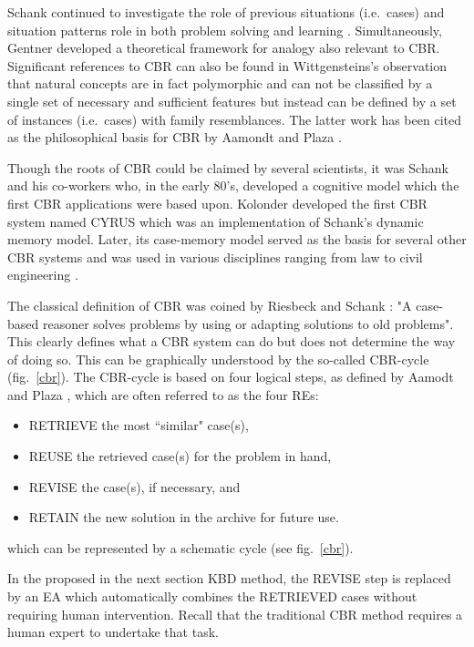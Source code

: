 Schank continued to investigate the role of previous situations (i.e.\ cases) 
and situation patterns role in both problem solving and learning \cite{Schank_1982}.  
Simultaneously, Gentner \cite{genter_1983} developed a  
theoretical framework for analogy also relevant to CBR. Significant references to CBR can also be found in 
Wittgensteins's observation \cite{wittgestein_1953} that natural concepts are in fact 
polymorphic and can not be classified by a single set of necessary and sufficient 
features but instead can be defined by a set of instances (i.e.\ cases) with family 
resemblances. The latter work has been cited as the philosophical basis for CBR by Aamondt and Plaza \cite{aamond_plaza_1994}.

Though the roots of CBR could be claimed by several scientists, it was Schank and his co-workers who, in the early 80's, developed a cognitive model which the first CBR applications were based upon. Kolonder developed the first CBR system named CYRUS \cite{kolodner_1983a,kolodner_1983b} which was an implementation of Schank's dynamic memory model. Later, its case-memory model served as the basis for several other CBR systems and was used in various disciplines ranging from law \cite{ashley_1988,rissland_skalak_1989} to civil engineering \cite{whatson_abdullah_1994,moore_1994}.

\label {CBR}  The classical definition of CBR was coined by Riesbeck and Schank \cite{riesbeck_1989}: "A case-based reasoner solves problems by using or adapting solutions to old problems". This clearly defines what a CBR system can do but does not determine the way of doing so. This can be graphically understood by the so-called CBR-cycle (fig.\ \ref{cbr}).  The CBR-cycle is based on four logical steps, as defined by Aamodt and Plaza \cite{aamond_plaza_1994}, which are often referred to as the four REs: 

\begin{itemize}
  \item RETRIEVE the most ``similar" case(s),
  \item REUSE the retrieved case(s) for the problem in hand,
  \item REVISE the case(s), if necessary, and
  \item RETAIN the new solution in the archive for future use.
\end{itemize}
which can be represented by a schematic cycle (see fig.\ \ref{cbr}).

In the proposed in the next section KBD method, the REVISE step is replaced by an EA which automatically combines the RETRIEVED cases without requiring human intervention. Recall that the traditional CBR method requires a human expert to undertake that task.  

